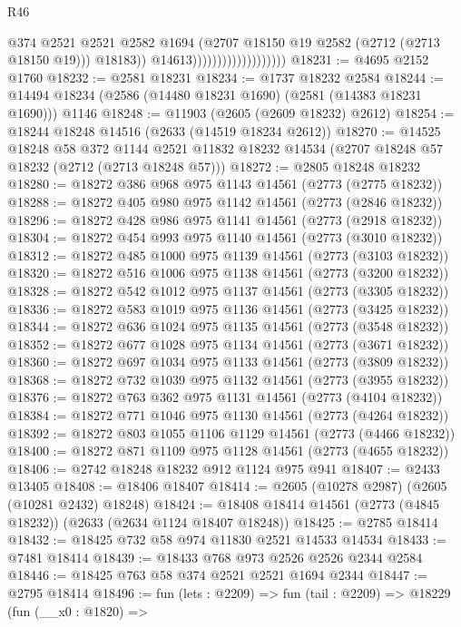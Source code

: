 \begin{lexlean}{R46}
\begin{coremodule}
                                              @374
                                              @2521
                                              @2521
                                              @2582
                                              @1694
                                              (@2707 @18150 @19 @2582 (@2712 (@2713 @18150 @19)))
                                              @18183))
                                          @14613)))))))))))))))))))
@18231 := @4695 @2152 @1760
@18232 := @2581 @18231
@18234 := @1737 @18232 @2584
@18244 := @14494 @18234 (@2586 (@14480 @18231 @1690) (@2581 (@14383 @18231 @1690))) @1146
@18248 := @11903 (@2605 (@2609 @18232) @2612)
@18254 := @18244 @18248 @14516 (@2633 (@14519 @18234 @2612))
@18270 := @14525
    @18248
    @58
    @372
    @1144
    @2521
    @11832
    @18232
    @14534
    (@2707 @18248 @57 @18232 (@2712 (@2713 @18248 @57)))
@18272 := @2805 @18248 @18232
@18280 := @18272 @386 @968 @975 @1143 @14561 (@2773 (@2775 @18232))
@18288 := @18272 @405 @980 @975 @1142 @14561 (@2773 (@2846 @18232))
@18296 := @18272 @428 @986 @975 @1141 @14561 (@2773 (@2918 @18232))
@18304 := @18272 @454 @993 @975 @1140 @14561 (@2773 (@3010 @18232))
@18312 := @18272 @485 @1000 @975 @1139 @14561 (@2773 (@3103 @18232))
@18320 := @18272 @516 @1006 @975 @1138 @14561 (@2773 (@3200 @18232))
@18328 := @18272 @542 @1012 @975 @1137 @14561 (@2773 (@3305 @18232))
@18336 := @18272 @583 @1019 @975 @1136 @14561 (@2773 (@3425 @18232))
@18344 := @18272 @636 @1024 @975 @1135 @14561 (@2773 (@3548 @18232))
@18352 := @18272 @677 @1028 @975 @1134 @14561 (@2773 (@3671 @18232))
@18360 := @18272 @697 @1034 @975 @1133 @14561 (@2773 (@3809 @18232))
@18368 := @18272 @732 @1039 @975 @1132 @14561 (@2773 (@3955 @18232))
@18376 := @18272 @763 @362 @975 @1131 @14561 (@2773 (@4104 @18232))
@18384 := @18272 @771 @1046 @975 @1130 @14561 (@2773 (@4264 @18232))
@18392 := @18272 @803 @1055 @1106 @1129 @14561 (@2773 (@4466 @18232))
@18400 := @18272 @871 @1109 @975 @1128 @14561 (@2773 (@4655 @18232))
@18406 := @2742 @18248 @18232 @912 @1124 @975 @941
@18407 := @2433 @13405
@18408 := @18406 @18407
@18414 := @2605 (@10278 @2987) (@2605 (@10281 @2432) @18248)
@18424 := @18408 @18414 @14561 (@2773 (@4845 @18232)) (@2633 (@2634 @1124 @18407 @18248))
@18425 := @2785 @18414
@18432 := @18425 @732 @58 @974 @11830 @2521 @14533 @14534
@18433 := @7481 @18414
@18439 := @18433 @768 @973 @2526 @2526 @2344 @2584
@18446 := @18425 @763 @58 @374 @2521 @2521 @1694 @2344
@18447 := @2795 @18414
@18496 := fun (lets : @2209) =>
  fun (tail : @2209) =>
  @18229
    (fun (__x0 : @1820) =>

\end{coremodule}
\end{lexlean}
